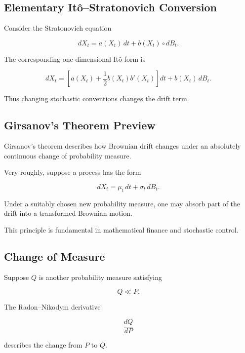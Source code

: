 \subsection{Elementary It\^o--Stratonovich Conversion}
\label{subsec:ito-stratonovich-conversion}

Consider the Stratonovich equation

\[
dX_t
=
a(X_t)\,dt
+
b(X_t)\circ dB_t.
\]

The corresponding one-dimensional It\^o form is

\[
\boxed{
dX_t
=
\left[
a(X_t)
+
\frac12
b(X_t)b'(X_t)
\right]dt
+
b(X_t)\,dB_t.
}
\]

Thus changing stochastic conventions changes the drift term.

\subsection{Girsanov's Theorem Preview}
\label{subsec:girsanov-preview}

Girsanov's theorem describes how Brownian drift changes under an
absolutely continuous change of probability measure.

Very roughly, suppose a process has the form

\[
dX_t
=
\mu_t\,dt
+
\sigma_t\,dB_t.
\]

Under a suitably chosen new probability measure, one may absorb part of
the drift into a transformed Brownian motion.

This principle is fundamental in mathematical finance and stochastic
control.

\subsection{Change of Measure}
\label{subsec:change-of-measure-stochastic}

Suppose \(Q\) is another probability measure satisfying

\[
Q\ll P.
\]

The Radon--Nikodym derivative

\[
\boxed{
\frac{dQ}{dP}
}
\]

describes the change from \(P\) to \(Q\).

